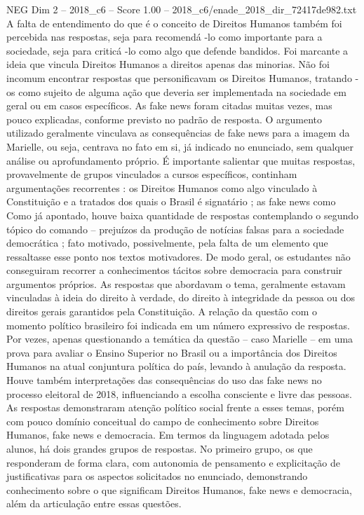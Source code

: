 \begin{textsample}{NEG Dim 2 – 2018\_c6 – Score 1.00 – 2018\_c6/enade\_2018\_dir\_72417de982.txt}
A falta de entendimento do que é o conceito de Direitos Humanos também foi percebida nas respostas, seja para recomendá -lo como importante para a sociedade, seja para criticá -lo como algo que defende bandidos.
Foi marcante a ideia que vincula Direitos Humanos a direitos apenas das minorias.
Não foi incomum encontrar respostas que personificavam os Direitos Humanos, tratando -os como sujeito de alguma ação que deveria ser implementada na sociedade em geral ou em casos específicos.
As fake news foram citadas muitas vezes, mas pouco explicadas, conforme previsto no padrão de resposta.
O argumento utilizado geralmente vinculava as consequências de fake news para a imagem da Marielle, ou seja, centrava no fato em si, já indicado no enunciado, sem qualquer análise ou aprofundamento próprio.
É importante salientar que muitas respostas, provavelmente de grupos vinculados a cursos específicos, continham argumentações recorrentes : os Direitos Humanos como algo vinculado à Constituição e a tratados dos quais o Brasil é signatário ; as fake news como Como já apontado, houve baixa quantidade de respostas contemplando o segundo tópico do comando – prejuízos da produção de notícias falsas para a sociedade democrática ; fato motivado, possivelmente, pela falta de um elemento que ressaltasse esse ponto nos textos motivadores.
De modo geral, os estudantes não conseguiram recorrer a conhecimentos tácitos sobre democracia para construir argumentos próprios.
As respostas que abordavam o tema, geralmente estavam vinculadas à ideia do direito à verdade, do direito à integridade da pessoa ou dos direitos gerais garantidos pela Constituição.
A relação da questão com o momento político brasileiro foi indicada em um número expressivo de respostas.
Por vezes, apenas questionando a temática da questão – caso Marielle – em uma prova para avaliar o Ensino Superior no Brasil ou a importância dos Direitos Humanos na atual conjuntura política do país, levando à anulação da resposta.
Houve também interpretações das consequências do uso das fake news no processo eleitoral de 2018, influenciando a escolha consciente e livre das pessoas.
As respostas demonstraram atenção político social frente a esses temas, porém com pouco domínio conceitual do campo de conhecimento sobre Direitos Humanos, fake news e democracia.
Em termos da linguagem adotada pelos alunos, há dois grandes grupos de respostas.
No primeiro grupo, os que responderam de forma clara, com autonomia de pensamento e explicitação de justificativas para os aspectos solicitados no enunciado, demonstrando conhecimento sobre o que significam Direitos Humanos, fake news e democracia, além da articulação entre essas questões.

\end{textsample}
